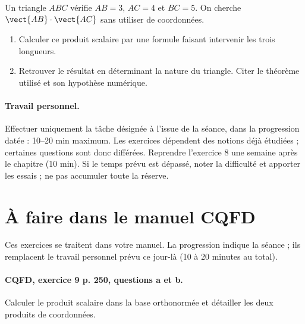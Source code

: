 Un triangle $ABC$ vérifie $AB=3$, $AC=4$ et $BC=5$. On cherche $\vect{AB}\cdot\vect{AC}$ sans utiliser de coordonnées.
\begin{enumerate}[label=\arabic*.]
\item Calculer ce produit scalaire par une formule faisant intervenir les trois longueurs.
\item Retrouver le résultat en déterminant la nature du triangle. Citer le théorème utilisé et son hypothèse numérique.
\end{enumerate}
\paragraph{Travail personnel.} Effectuer uniquement la tâche désignée à l’issue de la séance, dans la progression datée : 10–20 min maximum. Les exercices dépendent des notions déjà étudiées ; certaines questions sont donc différées. Reprendre l’exercice 8 une semaine après le chapitre (10 min). Si le temps prévu est dépassé, noter la difficulté et apporter les essais ; ne pas accumuler toute la réserve.
\endgroup
{}\section*{À faire dans le manuel CQFD}
Ces exercices se traitent dans votre manuel. La progression indique la séance ; ils remplacent le travail personnel prévu ce jour-là (10 à 20 minutes au total).
\paragraph{CQFD, exercice 9 p. 250, questions a et b.}\label{C03-M1} Calculer le produit scalaire dans la base orthonormée et détailler les deux produits de coordonnées.
